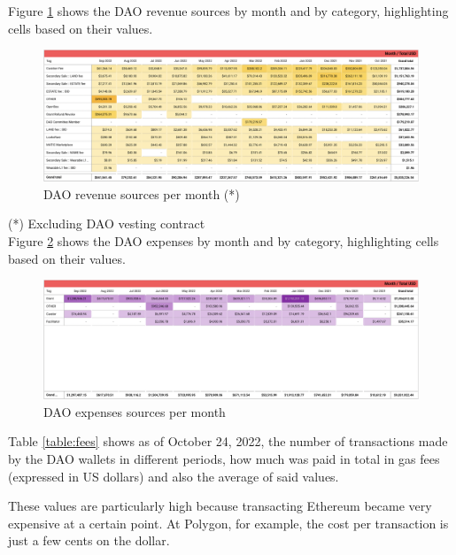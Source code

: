 \documentclass[MSE,Master,english]{twbook}%
\begin{document}
Figure \ref{fig:income} shows the \gls{DAO} revenue sources by month and by category, highlighting cells based on their values.
\begin{figure}[H]
  \centering
  \includegraphics[width=\textwidth]{metrics/income.png}
  \caption{DAO revenue sources per month (*)}
  \label{fig:income}
\end{figure}
(*) Excluding \gls{DAO} vesting contract\cite{DAOVesting} \\

Figure \ref{fig:expenses} shows the \gls{DAO} expenses by month and by category, highlighting cells based on their values.
\begin{figure}[H]
  \centering
  \includegraphics[width=\textwidth]{metrics/expenses.png}
  \caption{DAO expenses sources per month}
  \label{fig:expenses}
\end{figure}

Table \ref{table:fees} shows as of October 24, 2022, the number of transactions made by the \gls{DAO} wallets in different periods, how much was paid in total in gas fees (expressed in US dollars) and also the average of said values. 

These values are particularly high because transacting Ethereum became very expensive at a certain point. At Polygon, for example, the cost per transaction is just a few cents on the dollar.
\end{document}
